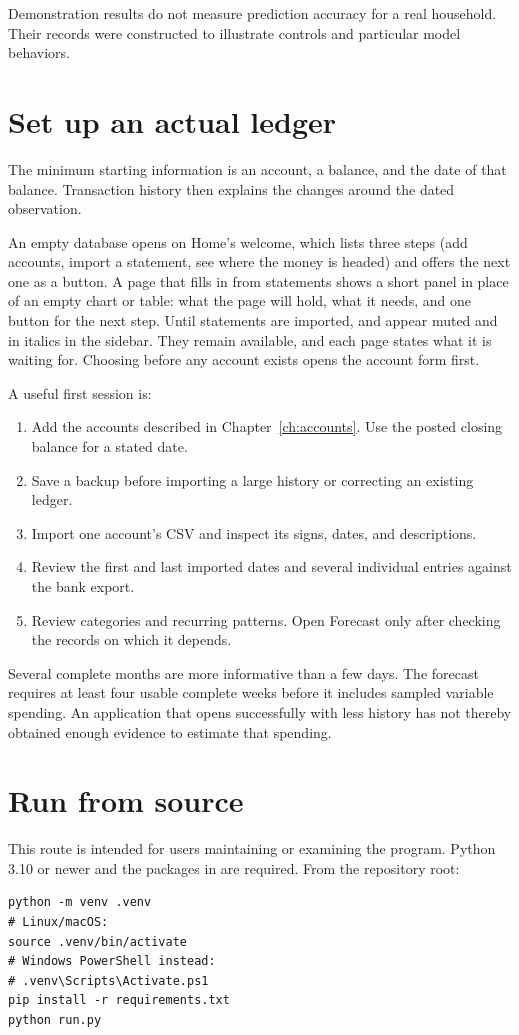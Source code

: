 Demonstration results do not measure prediction accuracy for a real household. Their records were constructed to illustrate controls and particular model behaviors.

\section{Set up an actual ledger}
The minimum starting information is an account, a balance, and the date of that balance. Transaction history then explains the changes around the dated observation.

An empty database opens on Home's welcome, which lists three steps (add accounts, import a statement, see where the money is headed) and offers the next one as a button. A page that fills in from statements shows a short panel in place of an empty chart or table: what the page will hold, what it needs, and one button for the next step. Until statements are imported,  and  appear muted and in italics in the sidebar. They remain available, and each page states what it is waiting for. Choosing  before any account exists opens the account form first.

A useful first session is:

\begin{enumerate}
\item Add the accounts described in Chapter~\ref{ch:accounts}. Use the posted closing balance for a stated date.
\item Save a backup before importing a large history or correcting an existing ledger.
\item Import one account's CSV and inspect its signs, dates, and descriptions.
\item Review the first and last imported dates and several individual entries against the bank export.
\item Review categories and recurring patterns. Open Forecast only after checking the records on which it depends.
\end{enumerate}

Several complete months are more informative than a few days. The forecast requires at least four usable complete weeks before it includes sampled variable spending. An application that opens successfully with less history has not thereby obtained enough evidence to estimate that spending.

\section{Run from source}
This route is intended for users maintaining or examining the program. Python 3.10 or newer and the packages in  are required. From the repository root:
\begin{lstlisting}
python -m venv .venv
# Linux/macOS:
source .venv/bin/activate
# Windows PowerShell instead:
# .venv\Scripts\Activate.ps1
pip install -r requirements.txt
python run.py
\end{lstlisting}

